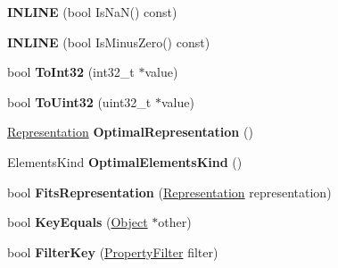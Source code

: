 \begin{DoxyCompactItemize}
\item 
{\bfseries I\+N\+L\+I\+NE} (bool Is\+NaN() const)\hypertarget{classv8_1_1internal_1_1_object_aa2be0425dbda121d187ee5816fdbdab1}{}\label{classv8_1_1internal_1_1_object_aa2be0425dbda121d187ee5816fdbdab1}

\item 
{\bfseries I\+N\+L\+I\+NE} (bool Is\+Minus\+Zero() const)\hypertarget{classv8_1_1internal_1_1_object_abb02697d8bf5a238b2b5ace75d2a2c00}{}\label{classv8_1_1internal_1_1_object_abb02697d8bf5a238b2b5ace75d2a2c00}

\item 
bool {\bfseries To\+Int32} (int32\+\_\+t $\ast$value)\hypertarget{classv8_1_1internal_1_1_object_a8fa72017bb0c2385165fe2075004b24b}{}\label{classv8_1_1internal_1_1_object_a8fa72017bb0c2385165fe2075004b24b}

\item 
bool {\bfseries To\+Uint32} (uint32\+\_\+t $\ast$value)\hypertarget{classv8_1_1internal_1_1_object_a3253b6a47805e7e72e2da86a8ebf8a93}{}\label{classv8_1_1internal_1_1_object_a3253b6a47805e7e72e2da86a8ebf8a93}

\item 
\hyperlink{classv8_1_1internal_1_1_representation}{Representation} {\bfseries Optimal\+Representation} ()\hypertarget{classv8_1_1internal_1_1_object_a9ceecdf37b8956d4be4eb45db0f3518d}{}\label{classv8_1_1internal_1_1_object_a9ceecdf37b8956d4be4eb45db0f3518d}

\item 
Elements\+Kind {\bfseries Optimal\+Elements\+Kind} ()\hypertarget{classv8_1_1internal_1_1_object_a82c1d8f9c05aa2cfa830f41309583a67}{}\label{classv8_1_1internal_1_1_object_a82c1d8f9c05aa2cfa830f41309583a67}

\item 
bool {\bfseries Fits\+Representation} (\hyperlink{classv8_1_1internal_1_1_representation}{Representation} representation)\hypertarget{classv8_1_1internal_1_1_object_a73384d8403dda7733708dbfc178f2c66}{}\label{classv8_1_1internal_1_1_object_a73384d8403dda7733708dbfc178f2c66}

\item 
bool {\bfseries Key\+Equals} (\hyperlink{classv8_1_1internal_1_1_object}{Object} $\ast$other)\hypertarget{classv8_1_1internal_1_1_object_a2e33849485658cc285ea94f1c16521f0}{}\label{classv8_1_1internal_1_1_object_a2e33849485658cc285ea94f1c16521f0}

\item 
bool {\bfseries Filter\+Key} (\hyperlink{namespacev8_afbf02b6b1152a3e25d7bde90798209ac}{Property\+Filter} filter)\hypertarget{classv8_1_1internal_1_1_object_af84c961ca1149c39037e1799ac6e48d6}{}\label{classv8_1_1internal_1_1_object_af84c961ca1149c39037e1799ac6e48d6}


\end{DoxyCompactItemize}
